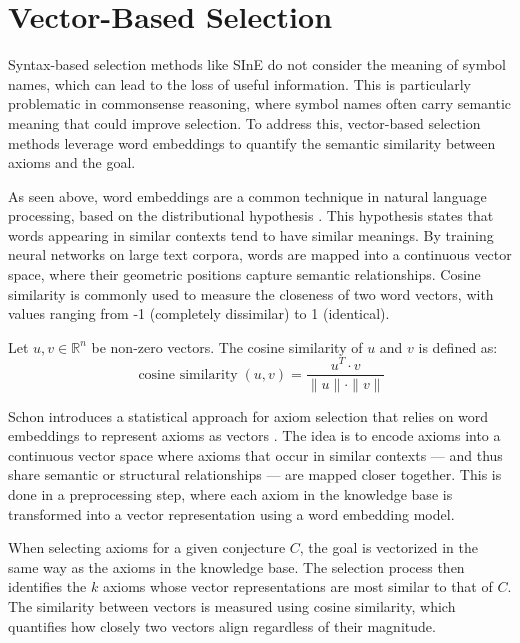 \documentclass[english,version-2020-11]{uzl-thesis}
\begin{document}
\section{Vector-Based Selection}

Syntax-based selection methods like SInE do not consider the meaning of symbol names, which can lead to the loss of useful information. This is particularly problematic in commonsense reasoning, where symbol names often carry semantic meaning that could improve selection. To address this, vector-based selection methods leverage word embeddings to quantify the semantic similarity between axioms and the goal.

As seen above, word embeddings are a common technique in natural language processing, based on the distributional hypothesis \cite{Miller1991}. This hypothesis states that words appearing in similar contexts tend to have similar meanings. By training neural networks on large text corpora, words are mapped into a continuous vector space, where their geometric positions capture semantic relationships. Cosine similarity is commonly used to measure the closeness of two word vectors, with values ranging from -1 (completely dissimilar) to 1 (identical).

\begin{definition}
    Let \( u, v \in \mathbb{R}^n \) be non-zero vectors. The cosine similarity of \( u \) and \( v \) is defined as:
    \begin{equation}
        \operatorname{cosine\ similarity}(u, v) = \frac{u^T \cdot v}{\|u\| \cdot \|v\|}
    \end{equation}
\end{definition}

Schon introduces a statistical approach for axiom selection that relies on word embeddings to represent axioms as vectors \cite{Schon2023}. The idea is to encode axioms into a continuous vector space where axioms that occur in similar contexts — and thus share semantic or structural relationships — are mapped closer together. This is done in a preprocessing step, where each axiom in the knowledge base is transformed into a vector representation using a word embedding model.

When selecting axioms for a given conjecture \( C \), the goal is vectorized in the same way as the axioms in the knowledge base. The selection process then identifies the \( k \) axioms whose vector representations are most similar to that of \( C \). The similarity between vectors is measured using cosine similarity, which quantifies how closely two vectors align regardless of their magnitude.
\end{document}
